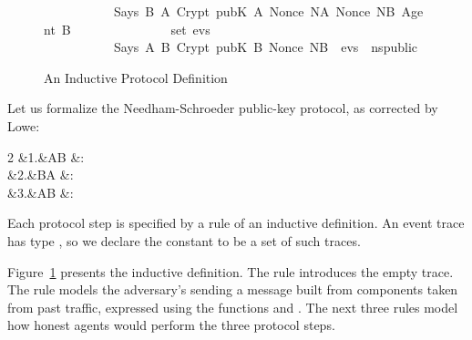 \begin{isabellebody}
\begin{figure}
\begin{isabelle}
\ \ \ \ \ \ \ \ \ \ \ Says\ B{}\ A\ {}Crypt\ {}pubK\ A{}\ {}Nonce\ NA{}\ Nonce\ NB{}\ Agent\ B{}{}\isanewline
\ \ \ \ \ \ \ \ \ \ \ \ \ \ {}\ set\ evs{}{}\isanewline
\ \ \ \ \ \ \ \ \ \ {}\ Says\ A\ B\ {}Crypt\ {}pubK\ B{}\ {}Nonce\ NB{}{}\ {}\ evs{}\ {}\ ns{}public{}%
\end{isabelle}
\caption{An Inductive Protocol Definition}\label{fig:ns_public}
\end{figure}
%
\begin{isamarkuptext}%
Let us formalize the Needham-Schroeder public-key protocol, as corrected by
Lowe:
\begin{alignat*%
}{2}
  &1.&\quad  A\to B  &:  \\
  &2.&\quad  B\to A  &:  \\
  &3.&\quad  A\to B  &: 
\end{alignat*%
}

Each protocol step is specified by a rule of an inductive definition.  An
event trace has type , so we declare the constant
 to be a set of such traces.

Figure~\ref{fig:ns_public} presents the inductive definition.  The
 rule introduces the empty trace.  The  rule models the
adversary's sending a message built from components taken from past
traffic, expressed using the functions  and
. 
The next three rules model how honest agents would perform the three
protocol steps.  


\end{isamarkuptext}
\end{isabellebody}
